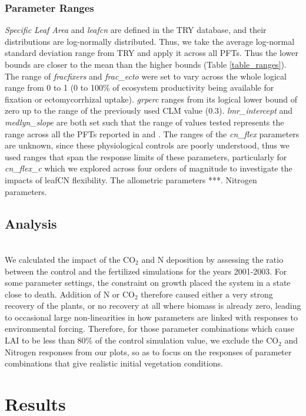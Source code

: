 \documentclass[draft,linenumbers]{agujournal}
\begin{document}
\subsubsection{Parameter Ranges}

\emph{Specific Leaf Area} and \emph{leafcn} are defined in the TRY database, and their distributions are log-normally distributed. Thus, we take the average log-normal standard deviation range from TRY and apply it across all PFTs. Thus the lower bounds are closer to the mean than the higher bounds (Table \ref{table_ranges}). The range of \emph{fracfixers} and \emph{frac\_ecto} were set to vary across the whole logical range from 0 to 1 (0 to 100\% of ecosystem productivity being available for fixation or ectomycorrhizal uptake). \emph{grperc} ranges from its logical lower bound of zero up to the range of the previously used CLM value (0.3). \emph{lmr\_intercept} and \emph{medlyn\_slope} are both set such that the range of values tested represents the range across all the PFTs reported in \cite{atkin2015} and \cite{dekauwe2015}. The ranges of the \emph{cn\_flex} parameters are unknown, since these physiological controls are poorly understood, thus we used ranges that span the response limits of these parameters, particularly for \emph{cn\_flex\_c} which we explored across four orders of magnitude to investigate the impacts of leafCN flexibility. The allometric parameters ***. Nitrogen parameters.


\subsection{Analysis}\\
We calculated the impact of the CO$_{2}$ and N deposition by assessing the ratio between the control and the fertilized simulations for the years 2001-2003. For some parameter settings, the constraint on growth placed the system in a state close to death. Addition of N or CO$_{2}$ therefore caused either a very strong recovery of the plants, or no recovery at all where biomass is already zero, leading to occasional large non-linearities in how parameters are linked with responses to environmental forcing. Therefore, for those parameter combinations which cause LAI to be less than 80\% of the control simulation value, we exclude the CO$_{2}$ and Nitrogen responses from our plots, so as to focus on the responses of parameter combinations that give realistic initial vegetation conditions.


\section{Results}
\end{document}
